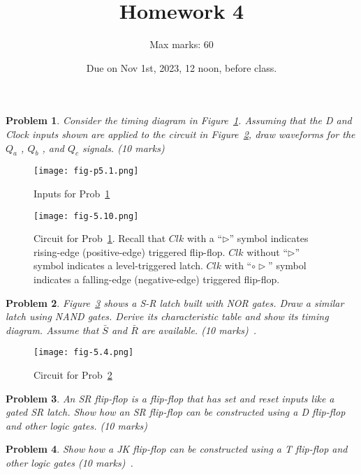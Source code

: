 \documentclass[twocolumn]{article}
\title{Homework 4}
\author{Max marks: 60}
\date{Due on Nov 1st, 2023, 12 noon, before class.}
\newtheorem{prob}{Problem}
\begin{document}
\maketitle
\begin{prob}
  Consider the timing diagram in Figure~\ref{fig:p51}. Assuming that the D and Clock inputs shown
  are applied to the circuit in Figure~\ref{fig:5.10}, draw waveforms for the
  $Q_a$ , $Q_b$ , and $Q_c$ signals. (10 marks)~\cite[Prob 5.1]{brown2013fundamentals}
  \label{prob:1}
\end{prob}
\begin{figure}[h]
  \texttt{[image: fig-p5.1.png]}
  \caption{Inputs for Prob~\ref{prob:1}}
  \label{fig:p51}
\end{figure}
\begin{figure}[ht!]
  \texttt{[image: fig-5.10.png]}
  \caption{Circuit for Prob~\ref{prob:1}.
    Recall that $Clk$ with a ``$\triangleright$'' symbol
    indicates rising-edge (positive-edge) triggered flip-flop. $Clk$ without
    ``$\triangleright$'' symbol indicates a level-triggered latch.
    $Clk$ with ``$\circ\triangleright$'' symbol
    indicates a falling-edge (negative-edge) triggered flip-flop. 
  }
  \label{fig:5.10}
\end{figure}

\begin{prob}
  Figure~\ref{fig:5.4} shows a S-R latch built with NOR gates. Draw a similar
latch using NAND gates. Derive its characteristic table and show its timing
diagram. Assume that $\bar{S}$ and $\bar{R}$ are available.
\label{prob:2} (10 marks)~\cite[Prob 5.2]{brown2013fundamentals}.
\end{prob}
\begin{figure}[ht!]
  \texttt{[image: fig-5.4.png]}
  \caption{Circuit for Prob~\ref{prob:2}}
  \label{fig:5.4}
\end{figure}

\begin{prob}
  An SR flip-flop is a flip-flop that has set and reset inputs like a gated SR
latch. Show how an SR flip-flop can be constructed using a D flip-flop and other
logic gates. (10 marks)~\cite[Prob 5.5]{brown2013fundamentals}
\end{prob}

\begin{prob}
  Show how a JK flip-flop can be constructed using a T flip-flop and other logic
  gates (10 marks)~\cite[Prob 5.7]{brown2013fundamentals}.
\end{prob}
\end{document}

